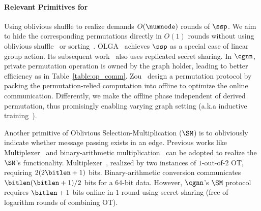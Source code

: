 \paragraph{Relevant Primitives for \osmm}
Using oblivious shuffle to realize \osmm demands $O(\numnode)$ rounds of $\ssp$.
We aim to hide the corresponding permutations directly in $O(1)$ rounds 
without using oblivious shuffle~\cite{ndss/SongYBDC23,uss/JiaSZDG22} or sorting~\cite{ccs/AsharovHIKNPTT22}.
OLGA~\cite{ccs/AttrapadungH0MO21} achieves $\ssp$ as a special case of linear group action.
Its subsequent work~\cite{ccs/AsharovHIKNPTT22} also uses 
replicated secret sharing.
In $\cgnn$, private permutation operation is owned by the graph holder, leading to better efficiency as in Table~\ref{table:op_comm}.
Zou~\etal \cite{ccs/ZouLSLXX24} design a permutation protocol by packing the permutation-relied computation into offline to optimize the online communication.
Differently, we make the offline phase independent of derived permutation, thus promisingly enabling varying graph setting (a.k.a inductive training~\cite{nips/WuYY21}).

Another primitive of Oblivious Selection-Multiplication ($\SM$) is to obliviously indicate whether message passing exists in an edge.
Previous works like Multiplexer~\cite{ccs/RatheeRKCGRS20} and binary-arithmetic multiplication~\cite{ndss/ABY15} can be adopted to realize the $\SM$'s functionality.
Multiplexer~\cite{ccs/RatheeRKCGRS20}, realized by two instances of $1$-out-of-$2$ OT, requiring $2(2\bitlen + 1)$ bits.
Binary-arithmetic conversion communicates $\bitlen(\bitlen+1)/2$ bits for a $64$-bit data. 
However, $\cgnn$'s $\SM$ protocol requires $\bitlen+1$ bits online in $1$ round using secret sharing (free of logarithm rounds of combining OT).


